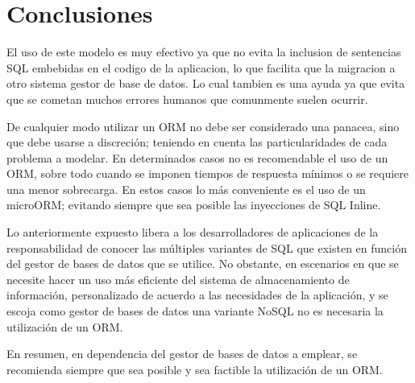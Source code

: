 \documentclass[preprint,12pt]{elsarticle}
\begin{document}


\section{Conclusiones}
El uso de este modelo es muy efectivo ya que no evita la inclusion de sentencias SQL embebidas en el codigo de la aplicacion, lo que facilita que la migracion a otro sistema gestor de base de datos. Lo cual tambien es una ayuda ya que evita que se cometan muchos errores humanos que comunmente suelen ocurrir.

De cualquier modo utilizar un ORM no debe ser considerado una panacea, sino que debe usarse a discreción; teniendo en cuenta las particularidades de cada problema a modelar. En determinados casos no es recomendable el uso de un ORM, sobre todo cuando se imponen tiempos de respuesta mínimos o se requiere una menor sobrecarga. En estos casos lo más conveniente es el uso de un microORM;
evitando siempre que sea posible las inyecciones de SQL Inline.

Lo anteriormente expuesto libera a los desarrolladores de aplicaciones de la responsabilidad de conocer las múltiples variantes de SQL que existen en función del gestor de bases de datos que se utilice. No obstante, en escenarios en que se necesite hacer un uso más eficiente del sistema de almacenamiento de información, personalizado de acuerdo a las necesidades de la aplicación, y se escoja como gestor de bases de datos una variante NoSQL no es necesaria la utilización de un ORM.

En resumen, en dependencia del gestor de bases de datos a emplear, se recomienda siempre que sea posible y sea factible la utilización de un ORM.	



	
	

	
	\newpage
	
		 

    

	
\end{document}
